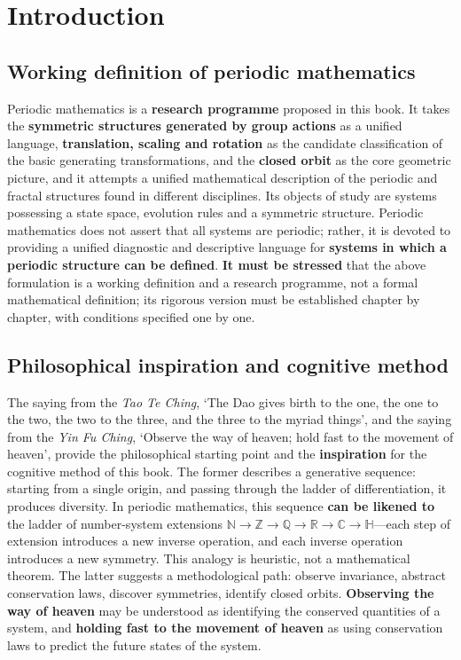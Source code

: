 \chapter*{Introduction}

\section*{Working definition of periodic mathematics}

\begin{definition}
Periodic mathematics is a \textbf{research programme} proposed in this book. It takes the \textbf{symmetric structures generated by group actions} as a unified language, \textbf{translation, scaling and rotation} as the candidate classification of the basic generating transformations, and the \textbf{closed orbit} as the core geometric picture, and it attempts a unified mathematical description of the periodic and fractal structures found in different disciplines. Its objects of study are systems possessing a state space, evolution rules and a symmetric structure. Periodic mathematics does not assert that all systems are periodic; rather, it is devoted to providing a unified diagnostic and descriptive language for \textbf{systems in which a periodic structure can be defined}. \textbf{It must be stressed} that the above formulation is a working definition and a research programme, not a formal mathematical definition; its rigorous version must be established chapter by chapter, with conditions specified one by one.
\end{definition}

\section*{Philosophical inspiration and cognitive method}

The saying from the \emph{Tao Te Ching}, `The Dao gives birth to the one, the one to the two, the two to the three, and the three to the myriad things', and the saying from the \emph{Yin Fu Ching}, `Observe the way of heaven; hold fast to the movement of heaven', provide the philosophical starting point and the \textbf{inspiration} for the cognitive method of this book. The former describes a generative sequence: starting from a single origin, and passing through the ladder of differentiation, it produces diversity. In periodic mathematics, this sequence \textbf{can be likened to} the ladder of number-system extensions $\mathbb{N} \to \mathbb{Z} \to \mathbb{Q} \to \mathbb{R} \to \mathbb{C} \to \mathbb{H}$---each step of extension introduces a new inverse operation, and each inverse operation introduces a new symmetry. This analogy is heuristic, not a mathematical theorem. The latter suggests a methodological path: observe invariance, abstract conservation laws, discover symmetries, identify closed orbits. \textbf{Observing the way of heaven} may be understood as identifying the conserved quantities of a system, and \textbf{holding fast to the movement of heaven} as using conservation laws to predict the future states of the system.

